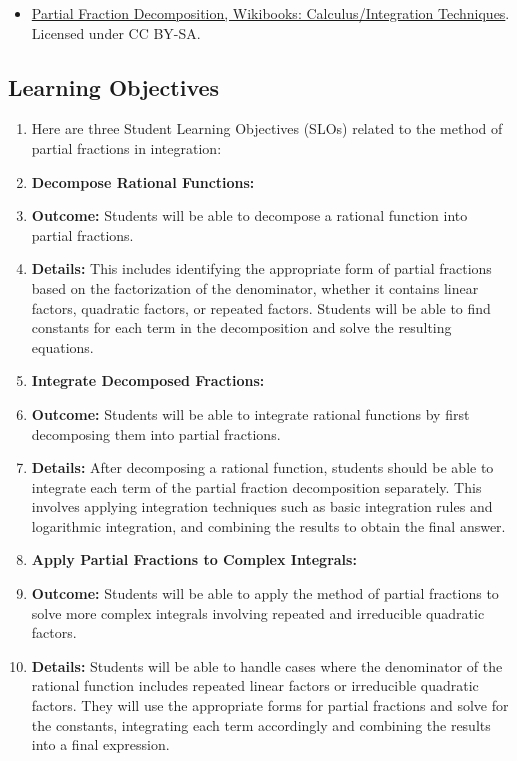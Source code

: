 \begin{itemize}

\item \href{https://en.wikibooks.org/wiki/Calculus/Integration_techniques/Partial_Fraction_Decomposition}{Partial Fraction Decomposition, Wikibooks: Calculus/Integration Techniques}.  
Licensed under CC BY-SA.

\end{itemize}

\subsection{Learning Objectives}

\begin{enumerate}
    \item Here are three Student Learning Objectives (SLOs) related to the method of partial fractions in integration:
    \item \textbf{Decompose Rational Functions:}
    \item \textbf{Outcome:} Students will be able to decompose a rational function into partial fractions.
    \item \textbf{Details:} This includes identifying the appropriate form of partial fractions based on the factorization of the denominator, whether it contains linear factors, quadratic factors, or repeated factors. Students will be able to find constants for each term in the decomposition and solve the resulting equations.
    \item \textbf{Integrate Decomposed Fractions:}
    \item \textbf{Outcome:} Students will be able to integrate rational functions by first decomposing them into partial fractions.
    \item \textbf{Details:} After decomposing a rational function, students should be able to integrate each term of the partial fraction decomposition separately. This involves applying integration techniques such as basic integration rules and logarithmic integration, and combining the results to obtain the final answer.
    \item \textbf{Apply Partial Fractions to Complex Integrals:}
    \item \textbf{Outcome:} Students will be able to apply the method of partial fractions to solve more complex integrals involving repeated and irreducible quadratic factors.
    \item \textbf{Details:} Students will be able to handle cases where the denominator of the rational function includes repeated linear factors or irreducible quadratic factors. They will use the appropriate forms for partial fractions and solve for the constants, integrating each term accordingly and combining the results into a final expression.
\end{enumerate}

